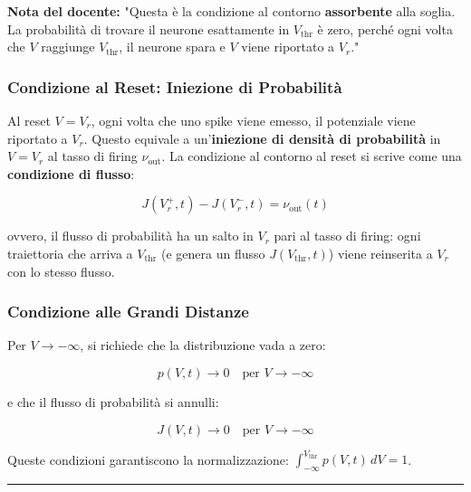 \begin{tcolorbox}[colback=gray!5, colframe=gray!40, arc=2mm, boxrule=0.5pt]
\textbf{Nota del docente:} "Questa è la condizione al contorno \textbf{assorbente} alla soglia. La probabilità di trovare il neurone esattamente in $V_{\text{thr}}$ è zero, perché ogni volta che $V$ raggiunge $V_{\text{thr}}$, il neurone spara e $V$ viene riportato a $V_r$."
\end{tcolorbox}

\subsubsection{Condizione al Reset: Iniezione di Probabilità}

Al reset $V = V_r$, ogni volta che uno spike viene emesso, il potenziale viene riportato a $V_r$. Questo equivale a un'\textbf{iniezione di densità di probabilità} in $V = V_r$ al tasso di firing $\nu_{\text{out}}$. La condizione al contorno al reset si scrive come una \textbf{condizione di flusso}:

\begin{equation}
J(V_r^+, t) - J(V_r^-, t) = \nu_{\text{out}}(t)
\end{equation}

ovvero, il flusso di probabilità ha un salto in $V_r$ pari al tasso di firing: ogni traiettoria che arriva a $V_{\text{thr}}$ (e genera un flusso $J(V_{\text{thr}}, t)$) viene reinserita a $V_r$ con lo stesso flusso.

\subsubsection{Condizione alle Grandi Distanze}

Per $V \to -\infty$, si richiede che la distribuzione vada a zero:

\begin{equation}
p(V, t) \to 0 \quad \text{per } V \to -\infty
\end{equation}

e che il flusso di probabilità si annulli:

\begin{equation}
J(V, t) \to 0 \quad \text{per } V \to -\infty
\end{equation}

Queste condizioni garantiscono la normalizzazione: $\int_{-\infty}^{V_{\text{thr}}} p(V, t)\, dV = 1$.

\vspace{0.5cm}
\noindent\rule{\textwidth}{0.4pt}
\vspace{0.5cm}

